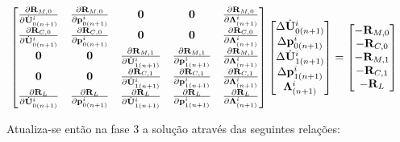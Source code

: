 \documentclass[tese_patricia]{subfiles}
\begin{document}
\begin{align}
	\begin{bmatrix}
		\frac{\partial\mathbf{R}_{M,0}}{\partial\dot{\mathbf{U}}_{0(n+1)}^{i}} & \frac{\partial\mathbf{R}_{M,0}}{\partial\mathbf{p}_{0(n+1)}^{i}} & \mathbf{0} & \mathbf{0} & \frac{\partial\mathbf{R}_{M,0}}{\partial\boldsymbol{\Lambda}_{(n+1)}^{i}} \\
		\frac{\partial\mathbf{R}_{C,0}}{\partial\dot{\mathbf{U}}_{0(n+1)}^{i}} & \frac{\partial\mathbf{R}_{C,0}}{\partial\mathbf{p}_{0(n+1)}^{i}} & \mathbf{0} & \mathbf{0} & \frac{\partial\mathbf{R}_{C,0}}{\partial\boldsymbol{\Lambda}_{(n+1)}^{i}} \\
		 \mathbf{0} & \mathbf{0} & \frac{\partial\mathbf{R}_{M,1}}{\partial\dot{\mathbf{U}}_{1(n+1)}^{i}} & \frac{\partial\mathbf{R}_{M,1}}{\partial\mathbf{p}_{1(n+1)}^{i}} & \frac{\partial\mathbf{R}_{M,1}}{\partial\boldsymbol{\Lambda}_{(n+1)}^{i}} \\
		 \mathbf{0} & \mathbf{0} & \frac{\partial\mathbf{R}_{C,1}}{\partial\dot{\mathbf{U}}_{1(n+1)}^{i}} & \frac{\partial\mathbf{R}_{C,1}}{\partial\mathbf{p}_{1(n+1)}^{i}} & \frac{\partial\mathbf{R}_{C,1}}{\partial\boldsymbol{\Lambda}_{(n+1)}^{i}} \\
		  \frac{\partial\mathbf{R}_{L}}{\partial\dot{\mathbf{U}}_{0(n+1)}^{i}} & \frac{\partial\mathbf{R}_{L}}{\partial\mathbf{p}_{0(n+1)}^{i}} & \frac{\partial\mathbf{R}_{L}}{\partial\dot{\mathbf{U}}_{1(n+1)}^{i}} & \frac{\partial\mathbf{R}_{L}}{\partial\mathbf{p}_{1(n+1)}^{i}} & \frac{\partial\mathbf{R}_{L}}{\partial\boldsymbol{\Lambda}_{(n+1)}^{i}}
	\end{bmatrix}
	\begin{bmatrix}
		\Delta\dot{\mathbf{U}}_{0(n+1)}^{i} \\
		\Delta\mathbf{p}_{0(n+1)}^{i} \\
		\Delta\dot{\mathbf{U}}_{1(n+1)}^{i} \\
		\Delta\mathbf{p}_{1(n+1)}^{i} \\
		\boldsymbol{\Lambda}_{(n+1)}^{i}
	\end{bmatrix}
	&=
	\begin{bmatrix}
		-\mathbf{R}_{M,0} \\
		-\mathbf{R}_{C,0} \\
		-\mathbf{R}_{M,1} \\
		-\mathbf{R}_{C,1} \\
		-\mathbf{R}_{L}
	\end{bmatrix}
	\label{eq:sistema_linear_Arlq}
\end{align}	

Atualiza-se então na fase 3 a solução através das seguintes relações:
\end{document}

